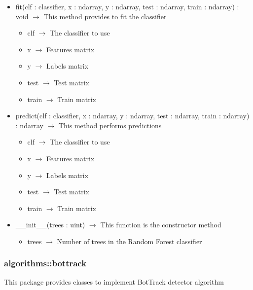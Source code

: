 \begin{description}
\begin{itemize}
\item fit(clf : classifier, x : ndarray, y : ndarray, test : ndarray, train : ndarray) : void $\rightarrow$ This method provides to fit the classifier\begin{itemize}
\item clf $\rightarrow$ The classifier to use
\item x $\rightarrow$ Features matrix
\item y $\rightarrow$ Labels matrix
\item test $\rightarrow$ Test matrix
\item train $\rightarrow$ Train matrix
\end{itemize}

\item predict(clf : classifier, x : ndarray, y : ndarray, test : ndarray, train : ndarray) : ndarray $\rightarrow$ This method performs predictions\begin{itemize}
\item clf $\rightarrow$ The classifier to use
\item x $\rightarrow$ Features matrix
\item y $\rightarrow$ Labels matrix
\item test $\rightarrow$ Test matrix
\item train $\rightarrow$ Train matrix
\end{itemize}

\item \_\_init\_\_(trees : uint) $\rightarrow$ This function is the constructor method\begin{itemize}
\item trees $\rightarrow$ Number of trees in the Random Forest classifier
\end{itemize}

\end{itemize}

\end{description}
\subsubsection{algorithms::bottrack}
This package provides classes to implement BotTrack detector algorithm

\hypertarget{algorithms::bottrack::BotTrackAlgorithm}{}
